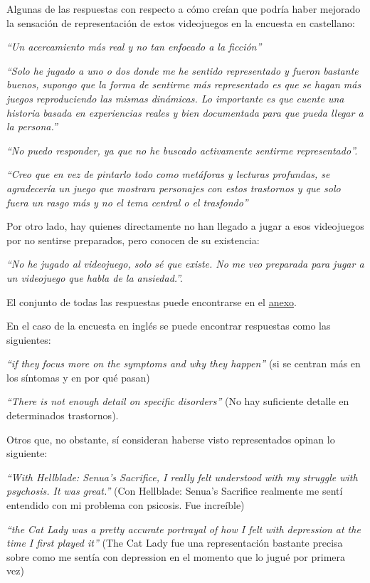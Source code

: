 \documentclass[12pt, a4paper,twoside,titlepage]{book}
\begin{document}
Algunas de las respuestas con respecto a cómo creían que podría haber mejorado la sensación de representación de estos videojuegos en la encuesta en castellano: 

\textit{``Un acercamiento más real y no tan enfocado a la ficción''}

\textit{``Solo he jugado a uno o dos donde me he sentido representado y fueron bastante buenos, supongo que la forma de sentirme más representado es que se hagan más juegos reproduciendo las mismas dinámicas. Lo importante es que cuente una historia basada en experiencias reales y bien documentada para que pueda llegar a la persona.''}

\textit{``No puedo responder, ya que no he buscado activamente sentirme representado''.}

\textit{``Creo que en vez de pintarlo todo como metáforas y lecturas profundas, se agradecería un juego que mostrara personajes con estos trastornos y que solo fuera un rasgo más y no el tema central o el trasfondo''}

Por otro lado, hay quienes directamente no han llegado a jugar a esos videojuegos por no sentirse preparados, pero conocen de su existencia: 

\textit{``No he jugado al videojuego, solo sé que existe. No me veo preparada para jugar a un videojuego que habla de la ansiedad.''. }

El conjunto de todas las respuestas puede encontrarse en el \hyperref[representacionCastellano]{anexo}. 

En el caso de la encuesta en inglés se puede encontrar respuestas como las siguientes: 

\textit{``if they focus more on the symptoms and why they happen''} (si se centran más en los síntomas y en por qué pasan)

\textit{``There is not enough detail on specific disorders''} (No hay suficiente detalle en determinados trastornos).

Otros que, no obstante, sí consideran haberse visto representados opinan lo siguiente: 

\textit{``With Hellblade: Senua's Sacrifice, I really felt understood with my struggle with psychosis. It was great.'' }(Con Hellblade: Senua’s Sacrifice realmente me sentí entendido con mi problema con psicosis. Fue increíble) 

\textit{``the Cat Lady was a pretty accurate portrayal of how I felt with depression at the time I first played it''} (The Cat Lady fue una representación bastante precisa sobre como me sentía con depression en el momento que lo jugué por primera vez) 
\end{document}
